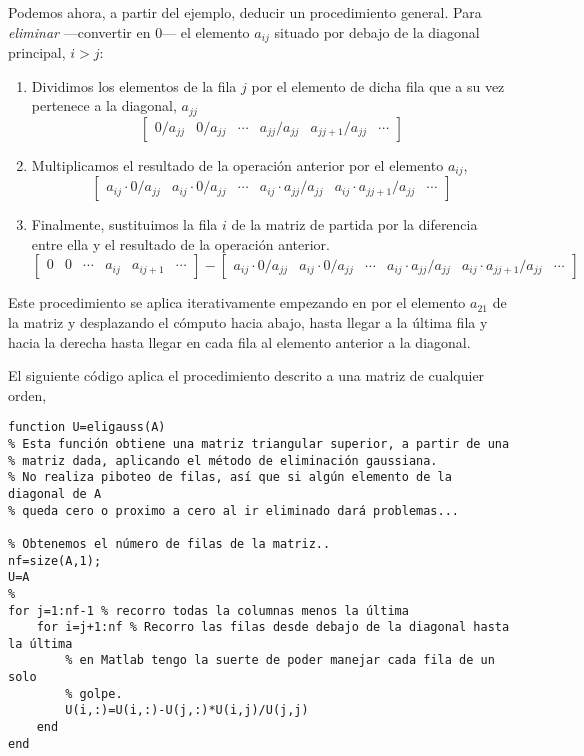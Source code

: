 Podemos ahora, a partir del ejemplo, deducir un procedimiento general. Para \emph{eliminar} ---convertir en 0--- el elemento $a_{ij}$ situado por debajo de la diagonal principal,  $i>j$:
\begin{enumerate}
\item Dividimos los elementos de la fila $j$ por el elemento de dicha fila que a su vez pertenece a la diagonal, $a_{jj}$
\begin{equation*}
\begin{bmatrix}
0/ a_{jj}& 0/ a_{jj}& \cdots & a_{jj}/ a_{jj}& a_{jj+1}/ a_{jj}& \cdots
\end{bmatrix}
\end{equation*}

\item Multiplicamos el resultado de la operación anterior por el elemento $a_{ij}$,
\begin{equation*}
\begin{bmatrix}
a_{ij} \cdot 0/ a_{jj}& a_{ij} \cdot 0/ a_{jj}& \cdots & a_{ij} \cdot a_{jj}/ a_{jj}& a_{ij} \cdot a_{jj+1}/ a_{jj}& \cdots
\end{bmatrix}
\end{equation*}
\item Finalmente, sustituimos la fila $i$ de la matriz de partida por la diferencia  entre ella y el resultado de la operación anterior.
\begin{equation*}
\begin{bmatrix}
0& 0& \cdots& a_{ij}& a_{ij+1}& \cdots
\end{bmatrix}-\begin{bmatrix}
a_{ij} \cdot 0/ a_{jj}& a_{ij} \cdot 0/ a_{jj}& \cdots & a_{ij} \cdot a_{jj}/ a_{jj}& a_{ij} \cdot a_{jj+1}/ a_{jj}& \cdots
\end{bmatrix}
\end{equation*}
\end{enumerate}

Este procedimiento se aplica iterativamente empezando en por el elemento  $a_{21}$ de la matriz y desplazando el cómputo hacia abajo, hasta llegar a la última fila y hacia la derecha hasta llegar en cada fila al elemento anterior a la diagonal.

El siguiente código aplica el procedimiento descrito a una matriz de cualquier orden,\label{elig}

\begin{lstlisting}
function U=eligauss(A)
% Esta función obtiene una matriz triangular superior, a partir de una
% matriz dada, aplicando el método de eliminación gaussiana.
% No realiza piboteo de filas, así que si algún elemento de la diagonal de A
% queda cero o proximo a cero al ir eliminado dará problemas...

% Obtenemos el número de filas de la matriz..
nf=size(A,1);
U=A
%
for j=1:nf-1 % recorro todas la columnas menos la última
    for i=j+1:nf % Recorro las filas desde debajo de la diagonal hasta la última
        % en Matlab tengo la suerte de poder manejar cada fila de un solo
        % golpe.
        U(i,:)=U(i,:)-U(j,:)*U(i,j)/U(j,j)
    end
end

\end{lstlisting}

